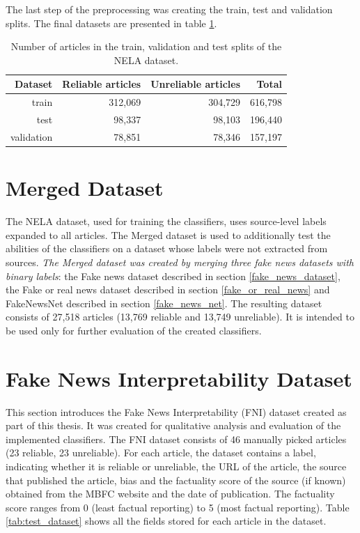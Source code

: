 The last step of the preprocessing was creating the train, test and validation splits. The final datasets are presented in table \ref{tab:nela_split}.

\begin{table}[H]
    \centering
\begin{tabular}{|r|r|r|r|}
\hline
\textbf{Dataset} & \textbf{Reliable articles} & \textbf{Unreliable articles} & \textbf{Total} \\ \hline
train & 312,069 & 304,729 & 616,798 \\ \hline
test & 98,337 & 98,103 & 196,440 \\ \hline
validation & 78,851 & 78,346 & 157,197 \\ \hline
\end{tabular}
    \caption{Number of articles in the train, validation and test splits of the NELA dataset.}
    \label{tab:nela_split}
\end{table}


\section{Merged Dataset}
\label{sec:merged}
The NELA dataset, used for training the classifiers, uses source-level labels expanded to all articles. The Merged dataset is used to additionally test the abilities of the classifiers on a dataset whose labels were not extracted from sources. \emph{The Merged dataset was created by merging three fake news datasets with binary labels}: the Fake news dataset described in section \ref{fake_news_dataset}, the Fake or real news dataset described in section \ref{fake_or_real_news} and FakeNewsNet described in section \ref{fake_news_net}. The resulting dataset consists of 27,518 articles (13,769 reliable and 13,749 unreliable). It is intended to be used only for further evaluation of the created classifiers.



\section{Fake News Interpretability Dataset}
\label{test-dataset}
This section introduces the Fake News Interpretability (FNI) dataset created as part of this thesis. It was created for qualitative analysis and evaluation of the implemented classifiers. The FNI dataset consists of 46 manually picked articles (23 reliable, 23 unreliable). For each article, the dataset contains a label, indicating whether it is reliable or unreliable, the URL of the article, the source that published the article, bias and the factuality score of the source (if known) obtained from the MBFC website and the date of publication. The factuality score ranges from 0 (least factual reporting) to 5 (most factual reporting). Table \ref{tab:test_dataset} shows all the fields stored for each article in the dataset.

